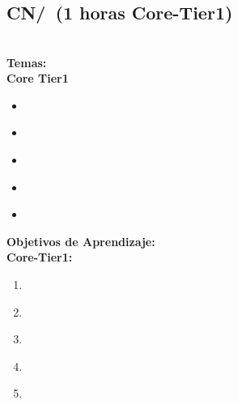 \section{\CN}\label{sec:BOK:CN}
\CNBOKDescription


\subsection{CN/\CNIntroductiontoModelingandSimulation~(1 horas Core-Tier1)}\label{sec:BOK:CNIntroductiontoModelingandSimulation}
\CNIntroductiontoModelingandSimulationDescription\\
\noindent \textbf{Temas:}\\
\noindent \textbf{Core Tier1}
\begin{itemize}
	\item \CNIntroductiontoModelingandSimulationTopicModels\label{sec:BOK:CNIntroductiontoModelingandSimulationTopicModels}
	\item \CNIntroductiontoModelingandSimulationTopicSimulations\label{sec:BOK:CNIntroductiontoModelingandSimulationTopicSimulations}
	\item \CNIntroductiontoModelingandSimulationTopicSimulation\label{sec:BOK:CNIntroductiontoModelingandSimulationTopicSimulation}
	\item \CNIntroductiontoModelingandSimulationTopicFoundational\label{sec:BOK:CNIntroductiontoModelingandSimulationTopicFoundational}
	\item \CNIntroductiontoModelingandSimulationTopicPresentation\label{sec:BOK:CNIntroductiontoModelingandSimulationTopicPresentation}
\end{itemize}


\noindent \textbf{Objetivos de Aprendizaje:}\\
\noindent \textbf{Core-Tier1:}
\begin{enumerate}
	\setcounter{enumi}{0}
	\item \CNIntroductiontoModelingandSimulationLODescribeTheModeling\xspace[\CNIntroductiontoModelingandSimulationLODescribeTheModelingLevel]\label{sec:BOK:CNIntroductiontoModelingandSimulationLODescribeTheModeling}
	\item \CNIntroductiontoModelingandSimulationLOCreate\xspace[\CNIntroductiontoModelingandSimulationLOCreateLevel]\label{sec:BOK:CNIntroductiontoModelingandSimulationLOCreate}
	\item \CNIntroductiontoModelingandSimulationLODifferentiate\xspace[\CNIntroductiontoModelingandSimulationLODifferentiateLevel]\label{sec:BOK:CNIntroductiontoModelingandSimulationLODifferentiate}
	\item \CNIntroductiontoModelingandSimulationLODescribeSeveral\xspace[\CNIntroductiontoModelingandSimulationLODescribeSeveralLevel]\label{sec:BOK:CNIntroductiontoModelingandSimulationLODescribeSeveral}
	\item \CNIntroductiontoModelingandSimulationLOCreateA\xspace[\CNIntroductiontoModelingandSimulationLOCreateALevel]\label{sec:BOK:CNIntroductiontoModelingandSimulationLOCreateA}
\end{enumerate}



